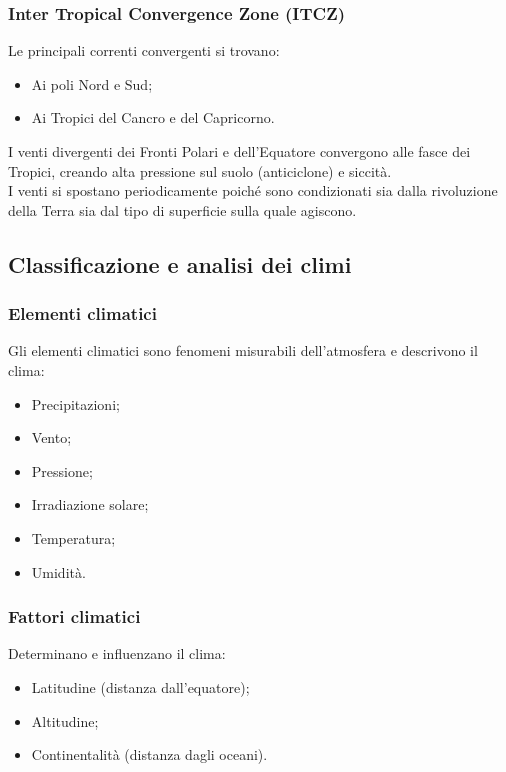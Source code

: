\documentclass{article}
\begin{document}
\subsubsection{Inter Tropical Convergence Zone (ITCZ)}
Le principali correnti convergenti si trovano:
\begin{itemize}
    \item Ai poli Nord e Sud;
    \item Ai Tropici del Cancro e del Capricorno.
\end{itemize}

I venti divergenti dei Fronti Polari e dell'Equatore convergono alle fasce dei Tropici, creando
alta pressione sul suolo (anticiclone) e siccità.\\
I venti si spostano periodicamente poiché sono condizionati sia dalla rivoluzione della Terra
sia dal tipo di superficie sulla quale agiscono.

\subsection{Classificazione e analisi dei climi}
\subsubsection{Elementi climatici}
Gli elementi climatici sono fenomeni misurabili dell'atmosfera e descrivono il clima:
\begin{itemize}
    \item Precipitazioni;
    \item Vento;
    \item Pressione;
    \item Irradiazione solare;
    \item Temperatura;
    \item Umidità.
\end{itemize}

\subsubsection{Fattori climatici}
Determinano e influenzano il clima:
\begin{itemize}
    \item Latitudine (distanza dall'equatore);
    \item Altitudine;
    \item Continentalità (distanza dagli oceani).
\end{itemize}
\end{document}
